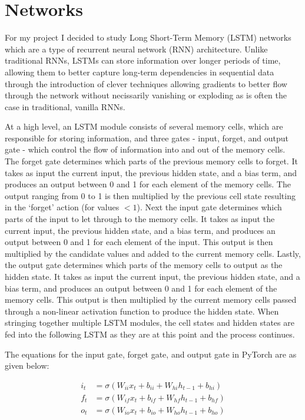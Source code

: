 \documentclass[12pt, twoside]{report}
\begin{document}
\section{Networks}

For my project I decided to study Long Short-Term Memory (LSTM) networks which are a type of 
recurrent neural network (RNN) architecture.
Unlike traditional RNNs, LSTMs can store information over longer periods of time, allowing them to better 
capture long-term dependencies in sequential data through the introduction of clever techniques allowing
gradients to better flow through the network without necissarily vanishing or exploding as is often the case
in traditional, vanilla RNNs.

At a high level, an LSTM module consists of several memory cells, which are responsible for storing information, 
and three gates - input, forget, and output gate - which control the flow of information into and out of the memory cells.
The forget gate determines which parts of the previous memory cells to forget.
It takes as input the current input, the previous hidden state, and a bias term, and produces an output between 0 and 1 
for each element of the memory cells.
The output ranging from 0 to 1 is then multiplied by the previous cell state resulting in the `forget' action 
(for values $< 1$).
Next the input gate determines which parts of the input to let through to the memory cells.
It takes as input the current input, the previous hidden state, and a bias term, and produces an output between 0 and 1 
for each element of the input.
This output is then multiplied by the candidate values and added to the current memory cells.
Lastly, the output gate determines which parts of the memory cells to output as the hidden state.
It takes as input the current input, the previous hidden state, and a bias term, and produces an output between 0 and 1 
for each element of the memory cells.
This output is then multiplied by the current memory cells passed through a non-linear activation function to 
produce the hidden state.
When stringing together multiple LSTM modules, the cell states and hidden states are fed into the following LSTM
as they are at this point and the process continues.

The equations for the input gate, forget gate, and output gate in PyTorch are as given below:

\begin{align}
    i_t &= \sigma(W_{ii} x_t + b_{ii} + W_{hi} h_{t-1} + b_{hi}) \\
    f_t &= \sigma(W_{if} x_t + b_{if} + W_{hf} h_{t-1} + b_{hf}) \\
    o_t &= \sigma(W_{io} x_t + b_{io} + W_{ho} h_{t-1} + b_{ho})
\end{align}
\end{document}

